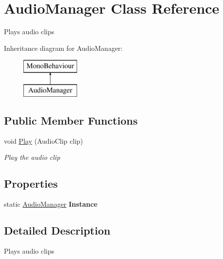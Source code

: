 \hypertarget{class_audio_manager}{}\section{Audio\+Manager Class Reference}
\label{class_audio_manager}


Plays audio clips  


Inheritance diagram for Audio\+Manager\+:\begin{figure}[H]
\begin{center}
\leavevmode
\includegraphics[height=2.000000cm]{class_audio_manager}
\end{center}
\end{figure}
\subsection*{Public Member Functions}
\begin{DoxyCompactItemize}
\item 
void \hyperlink{class_audio_manager_af401954d7711745f75405042bae394a8}{Play} (Audio\+Clip clip)
\begin{DoxyCompactList}\small\item\em Play the audio clip \end{DoxyCompactList}\end{DoxyCompactItemize}
\subsection*{Properties}
\begin{DoxyCompactItemize}
\item 
static \hyperlink{class_audio_manager}{Audio\+Manager} {\bfseries Instance}\hypertarget{class_audio_manager_af96f8bc4f9a0ad3f1a63a028bb31f790}{}\label{class_audio_manager_af96f8bc4f9a0ad3f1a63a028bb31f790}

\end{DoxyCompactItemize}


\subsection{Detailed Description}
Plays audio clips 



